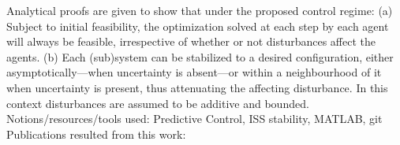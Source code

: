 Analytical proofs are given to show that under the proposed control regime: (a)
Subject to initial feasibility, the optimization solved at each step by each
agent will always be feasible, irrespective of whether or not disturbances
affect the agents. (b) Each (sub)system can be stabilized to a desired
configuration, either asymptotically---when uncertainty is absent---or within a
neighbourhood of it when uncertainty is present, thus attenuating the
affecting disturbance. In this context disturbances are assumed to be additive
and bounded.\\

\noindent Notions/resources/tools used: Predictive Control, ISS stability, MATLAB, git\\

\noindent Publications resulted from this work: \cite{Filotheou2018,Filotheou2020} \\

